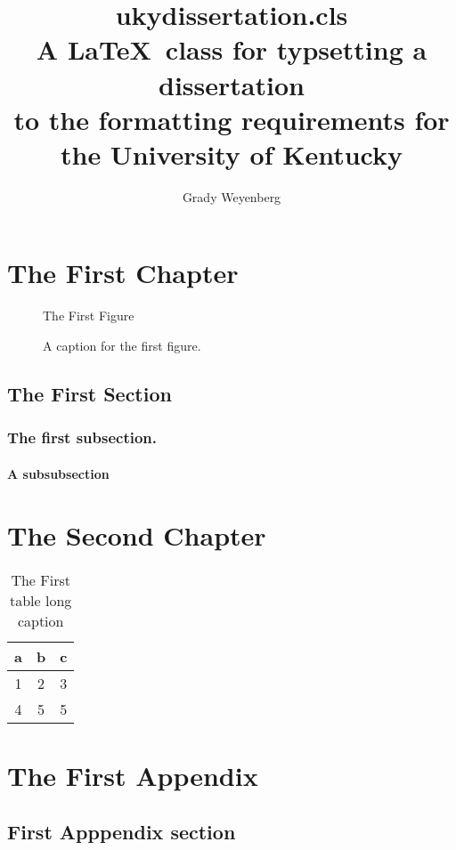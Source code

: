 \documentclass[endorse]{ukydissertation}
\title{ukydissertation.cls\protect\\%
  A \LaTeX\ class for typsetting a dissertation\protect\\%
  to the formatting requirements for\protect\\%
  the University of Kentucky}
\author{Grady Weyenberg}
\begin{document}
\makefrontmatter

\chapter{The First Chapter}
\label{cha:first-chapter}
\lipsum*[1]\citep{lamport1994latex}

\begin{figure}
  \centering
  The First Figure
  \caption[A name for the ToC]{A caption for the first figure.}
  \label{fig:numberone}
\end{figure}
\section{The First Section}
\label{sec:first-section}
\lipsum[2]
\subsection{The first subsection.}
\label{sec:first-subsection}
\lipsum[3]
\subsubsection{A subsubsection}
\lipsum[4-10]
\chapter{The Second Chapter}
\label{cha:second-chapter}
\lipsum[11-15]
\begin{table}
  \caption[The first table shortname]{The First table long caption}
  \label{tab:numberone}
  \centering
  \begin{tabular}{ccc}
    \hline
    a&b&c\\
    \hline
    1&2&3\\
    4&5&5\\
    \hline
  \end{tabular}
\end{table}
\lipsum[16-20]
\backmatter

\chapter{The First Appendix}
\label{cha:first-appendix}
\lipsum[21-23]

\section{First Apppendix section}
\label{sec:first-appp-sect}
\lipsum[24-29]



\vita
\lipsum[30-33]
\end{document}

